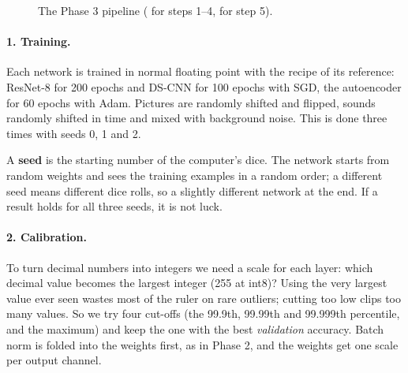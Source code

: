 \begin{figure}[H]
\centering
{}
\caption{The Phase 3 pipeline ( for steps 1--4,  for step 5).}
\end{figure}

\paragraph{1. Training.} Each network is trained in normal floating point with the recipe of its reference:
ResNet-8 for 200 epochs and DS-CNN for 100 epochs with SGD, the autoencoder for 60 epochs with Adam. Pictures are
randomly shifted and flipped, sounds randomly shifted in time and mixed with background noise. This is done
three times with seeds 0, 1 and 2.

\begin{kid}
A \textbf{seed} is the starting number of the computer's dice. The network starts from random weights and sees
the training examples in a random order; a different seed means different dice rolls, so a slightly different
network at the end. If a result holds for all three seeds, it is not luck.
\end{kid}

\paragraph{2. Calibration.} To turn decimal numbers into integers we need a scale for each layer: which decimal
value becomes the largest integer (255 at int8)? Using the very largest value ever seen wastes most of the
ruler on rare outliers; cutting too low clips too many values. So we try four cut-offs (the 99.9th, 99.99th and
99.999th percentile, and the maximum) and keep the one with the best \emph{validation} accuracy. Batch norm is
folded into the weights first, as in Phase 2, and the weights get one scale per output channel.

